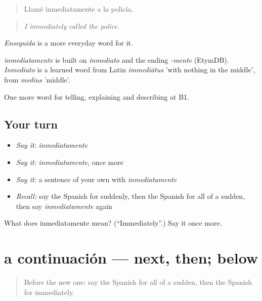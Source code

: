\begin{quote}
Llamé inmediatamente a la policía.
\end{quote}

\begin{quote}
\emph{I immediately called the police.}
\end{quote}

\emph{Enseguida} is a more everyday word for it.

\begin{cousinweb}
\emph{inmediatamente} is built on \emph{inmediato} and the ending \emph{-mente} (EtymDB). \emph{Inmediato} is a learned word from Latin \emph{immediātus} 'with nothing in the middle', from \emph{medius} 'middle'.
\end{cousinweb}

\begin{grammarlens}[title={What you've built}]
One more word for telling, explaining and describing at B1.
\end{grammarlens}

\subsection*{Your turn}
\begin{itemize}
\raggedright
  \item \emph{Say it:} \emph{inmediatamente}
  \item \emph{Say it:} \emph{inmediatamente}, once more
  \item \emph{Say it:} a sentence of your own with \emph{inmediatamente}
  \item \emph{Recall:} say the Spanish for suddenly, then the Spanish for all of a sudden, then say \emph{inmediatamente} again
\end{itemize}

\begin{tcolorbox}[breakable,colback=teal!4,colframe=teal!35!black,title={Before you move on}]
What does inmediatamente mean? (\textquotedblleft{}Immediately\textquotedblright{}.) Say it once more.
\end{tcolorbox}
\section[a continuación]{a continuación — next, then; below}

\label{lesson:ES-C534-a-continuacion}



\begin{quote}
Before the new one: say the Spanish for all of a sudden, then the Spanish for immediately.
\end{quote}

